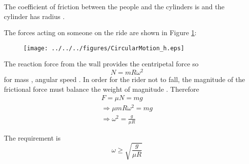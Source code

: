 
\begin{problem}
{ The coefficient of friction between the people and the cylinders is \vari{\mu} and the cylinder has radius . 
}
{}
{The forces acting on someone on the ride are shown in Figure \ref{fig:CircularMotion_h}:
\begin{figure}[h]
\centering
\texttt{[image: ../../../figures/CircularMotion\_h.eps]}
\caption{}
\label{fig:CircularMotion_h}
\end{figure}
The reaction force  from the wall provides the centripetal force so
\begin{equation*}
N=mR\omega^2
\end{equation*}
for mass , angular speed \vari{\omega}. In order for the rider not to fall, the magnitude of the frictional force  must balance the weight of magnitude . Therefore
\begin{align*}
F=\mu N=mg \\
\Rightarrow \mu mR\omega^2=mg \\
\Rightarrow \omega^2=\frac{g}{\mu R}
\end{align*}

The requirement is 
\begin{equation*}
\omega\ge\sqrt{\frac{g}{\mu R}}
\end{equation*}

}
\end{problem}